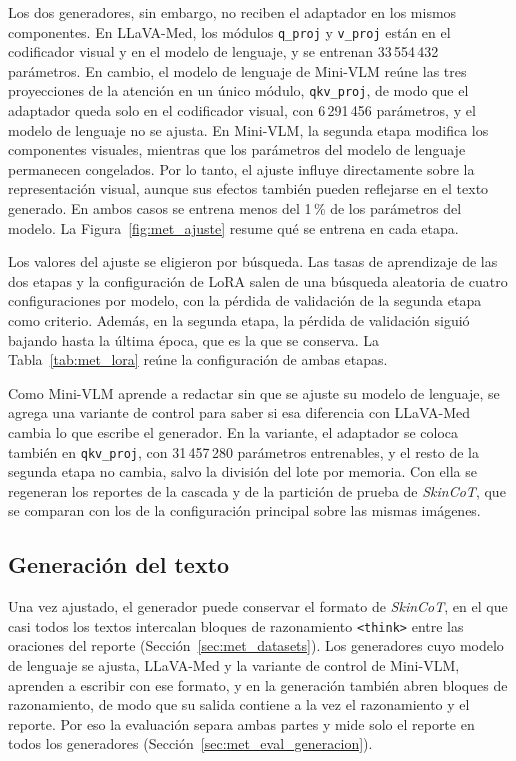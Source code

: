 Los dos generadores, sin embargo, no reciben el adaptador en los mismos componentes. En LLaVA-Med, los módulos
\texttt{q\_proj} y \texttt{v\_proj} están en el codificador visual y en el modelo de lenguaje, y se entrenan
33\,554\,432 parámetros. En cambio, el modelo de lenguaje de Mini-VLM reúne las tres proyecciones de la atención en un
único módulo, \texttt{qkv\_proj}, de modo que el adaptador queda solo en el codificador visual, con 6\,291\,456
parámetros, y el modelo de lenguaje no se ajusta. En Mini-VLM, la segunda etapa modifica los componentes visuales, mientras que los parámetros del modelo de lenguaje permanecen congelados. Por lo tanto, el ajuste influye directamente sobre la representación visual, aunque sus efectos también pueden reflejarse en el texto generado. En ambos casos se entrena menos del 1\,\% de los
parámetros del modelo. La Figura~\ref{fig:met_ajuste} resume qué se entrena en cada etapa.



Los valores del ajuste se eligieron por búsqueda. Las tasas de aprendizaje de las dos etapas y la configuración de LoRA
salen de una búsqueda aleatoria de cuatro configuraciones por modelo, con la pérdida de validación de la segunda etapa
como criterio. Además, en la segunda etapa, la pérdida de validación siguió bajando hasta la última época, que es la que
se conserva. La Tabla~\ref{tab:met_lora} reúne la configuración de ambas etapas.

Como Mini-VLM aprende a redactar sin que se ajuste su modelo de lenguaje, se agrega una variante de control para
saber si esa diferencia con LLaVA-Med cambia lo que escribe el generador. En la variante, el adaptador se coloca
también en \texttt{qkv\_proj}, con 31\,457\,280 parámetros entrenables, y el resto de la segunda etapa no cambia,
salvo la división del lote por memoria. Con ella se regeneran los reportes de la cascada y de la partición de prueba
de \emph{SkinCoT}, que se comparan con los de la configuración principal sobre las mismas imágenes.

\subsection{Generación del texto}

Una vez ajustado, el generador puede conservar el formato de \emph{SkinCoT}, en el que casi todos los textos
intercalan bloques de razonamiento \texttt{\textless think\textgreater} entre las oraciones del reporte
(Sección~\ref{sec:met_datasets}). Los generadores cuyo modelo de lenguaje se ajusta, LLaVA-Med y la variante de
control de Mini-VLM, aprenden a escribir con ese formato, y en la generación también abren bloques de razonamiento,
de modo que su salida contiene a la vez el razonamiento y el reporte. Por eso la evaluación separa ambas partes y mide
solo el reporte en todos los generadores (Sección~\ref{sec:met_eval_generacion}).


